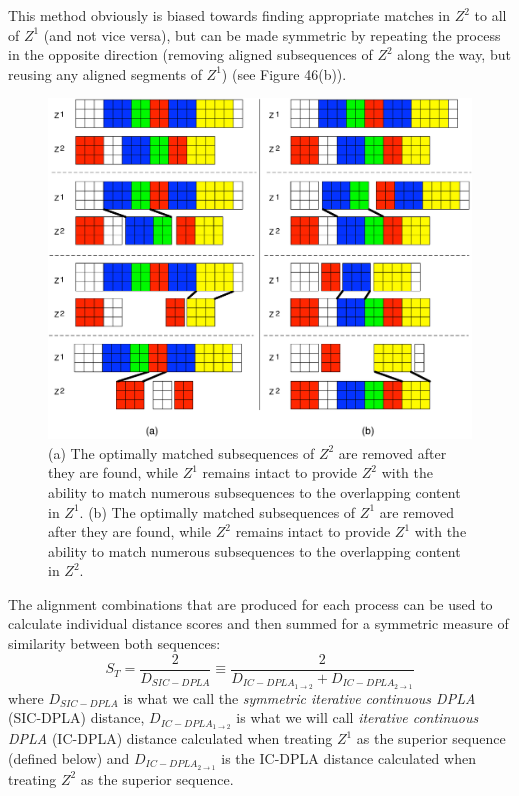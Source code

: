 \documentclass[12pt]{report} 	%
\numberwithin{figure}{chapter}
\numberwithin{table}{chapter}
\numberwithin{equation}{chapter}
\begin{document}
\begin{flushleft}
This method obviously is biased towards finding appropriate matches in $Z^2$ to all of $Z^1$ (and not vice versa), but can be made symmetric by repeating the process in the opposite direction (removing aligned subsequences of $Z^2$ along the way, but reusing any aligned segments of $Z^1$) (see Figure 46(b)). 
\vspace{12pt}
\begin{figure}[h!]
\begin{center}
\includegraphics[width=\linewidth]{GreedyMatching4}
\caption[Asymmetric greedy removal after matching in both directions]{(a) The optimally matched subsequences of $Z^2$ are removed after they are found, while $Z^1$ remains intact to provide $Z^2$ with the ability to match numerous subsequences to the overlapping content in $Z^1$. (b) The optimally matched subsequences of $Z^1$ are removed after they are found, while $Z^2$ remains intact to provide $Z^1$ with the ability to match numerous subsequences to the overlapping content in $Z^2$.}
\end{center}
\end{figure}
The alignment combinations that are produced for each process can be used to calculate individual distance scores and then summed for a symmetric measure of similarity between both sequences:
\begin{equation}
S_T = \frac{2}{D_{SIC-DPLA}} \equiv \frac{2}{D_{IC-DPLA_{1\to2}} + D_{IC-DPLA_{2\to1}}}
\end{equation}
where $D_{SIC-DPLA}$ is what we call the \textit{symmetric iterative continuous DPLA} (SIC-DPLA) distance, $D_{IC-DPLA_{1\to2}}$ is what we will call \textit{iterative continuous DPLA} (IC-DPLA) distance calculated when treating $Z^1$ as the superior sequence (defined below) and $D_{IC-DPLA_{2\to1}}$ is the IC-DPLA distance calculated when treating $Z^2$ as the superior sequence.


\end{flushleft}
\end{document}

